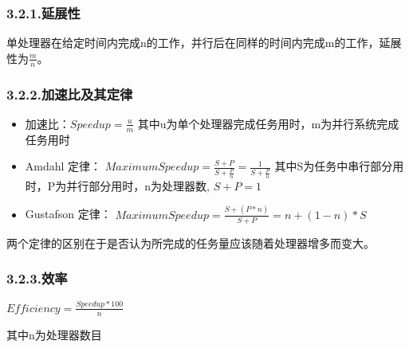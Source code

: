\documentclass{article}
\begin{document}
\subsubsection{3.2.1.\hspace*{0.5em}延展性}\label{section}%

\noindent{}单处理器在给定时间内完成n的工作，并行后在同样的时间内完成m的工作，延展性为$\frac{m}{n}$。%

\subsubsection{3.2.2.\hspace*{0.5em}加速比及其定律}\label{section}%

\begin{itemize}[noitemsep,topsep=\mdcompacttopsep]%

\item{}加速比：$Speedup = \frac{u}{m}$ 其中u为单个处理器完成任务用时，m为并行系统完成任务用时%

\item{}Amdahl 定律： $Maximum Speedup = \frac{S + P}{S + \frac{P}{n}} = \frac{1}{S + \frac{P}{n}}$ 其中S为任务中串行部分用时，P为并行部分用时，n为处理器数, $S + P = 1$%

\item{}Gustafson 定律： $Maximum Speedup = \frac{S + (P * n)}{S + P} = n + (1 - n) *S$%
\end{itemize}%

\noindent{}两个定律的区别在于是否认为所完成的任务量应该随着处理器增多而变大。%

\subsubsection{3.2.3.\hspace*{0.5em}效率}\label{section}%

\noindent{}$Efficiency = \frac{Speedup * 100}{n}$%

其中n为处理器数目%
\end{document}
